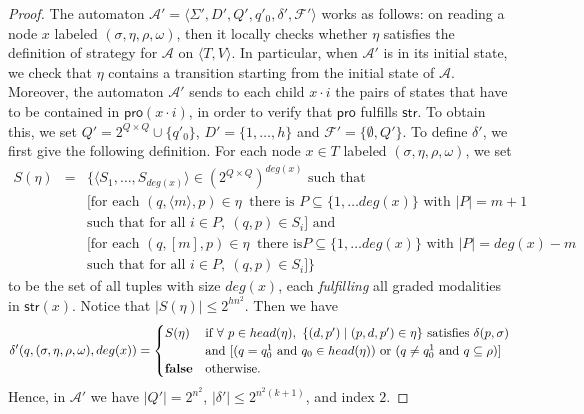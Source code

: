 \documentclass{LMCS}
\theoremstyle{plain}
\def \A             {\mathcal{A}}
\def \degree        {deg}
\def \F             {\mathcal{F}}
\def \prom          {\ensuremath{\mathsf{pro}}\xspace}
\def \strat         {\ensuremath{\mathsf{str}}\xspace}
\newcommand \tpl[1] {\langle #1 \rangle}
\begin{document}
\begin{proof}
The automaton $\A' = \tpl{\Sigma', D', Q', q'_0, \delta', \F'}$
works as follows: on reading a node $x$ labeled $(\sigma, \eta,
\rho, \omega)$, then it locally checks whether $\eta$ satisfies
the definition of strategy for $\A$ on $\tpl{T,V}$. In particular,
when $\A'$ is in its initial state, we check that $\eta$ contains
a transition starting from the initial state of $\A$. Moreover,
the automaton $\A'$ sends to each child $x \cdot i$ the pairs of
states that have to be contained in $\prom(x \cdot i)$, in order
to verify that $\prom$ fulfills $\strat$. To obtain this, we set
$Q' = 2^{Q \times Q} \cup \{q'_0\}$, $D' = \{1, \ldots, h\}$ and
$\F' = \{\emptyset, Q'\}$. To define $\delta'$, we first give the
following definition. For each node $x \in T$ labeled $(\sigma,
\eta, \rho, \omega)$, we set {\small
    $$\begin{array}{lcl}
        S(\eta) &=& \{\tpl{S_1, \ldots, S_{\degree(x)}} \in (2^{Q \times Q})^{\degree(x)} \mbox{ such that} \\
        & & [\mbox{for each } (q, \tpl{m}, p) \in \eta\ \mbox{ there is } P \subseteq \{1, \ldots \degree(x)\}
            \mbox{ with } |P| = m+1 \\
        & & \mbox{such that for all } i \in P,\ (q,p) \in S_i] \mbox{ and} \\
        & & [\mbox{for each } (q, [m], p) \in \eta\ \mbox{ there is}  P \subseteq \{1, \ldots \degree(x)\}
            \mbox{ with } |P| = \degree(x)-m \\
        & & \mbox{such that for all } i \in P,\ (q,p) \in S_i]\}\
    \end{array}$$}
to be the set of all tuples with size $\degree(x)$, each
\emph{fulfilling} all graded modalities in $\strat(x)$. Notice
that $|S(\eta)| \leq 2^{hn^2}$. Then we have {\small
    $$\delta'(q, (\sigma, \eta, \rho, \omega), \degree(x)) = \begin{cases}
        S(\eta)     & \mbox{if } \forall\ p \in head(\eta),\ \{(d,p') \mid (p,d,p') \in \eta\}
                              \mbox{ satisfies } \delta(p, \sigma) \\
                    & \mbox{and } [(q = q_0^1 \mbox{ and } q_0 \in head(\eta))
                              \mbox{ or } (q \neq q_0^1 \mbox{ and } q \subseteq \rho)] \\
        {\bf false} & \mbox{otherwise.}
    \end{cases}$$}
\noindent Hence, in $\A'$ we have $|Q'| = 2^{n^2}$, $|\delta'|
\leq 2^{n^2(k+1)}$, and index $2$.


\end{proof}
\end{document}
